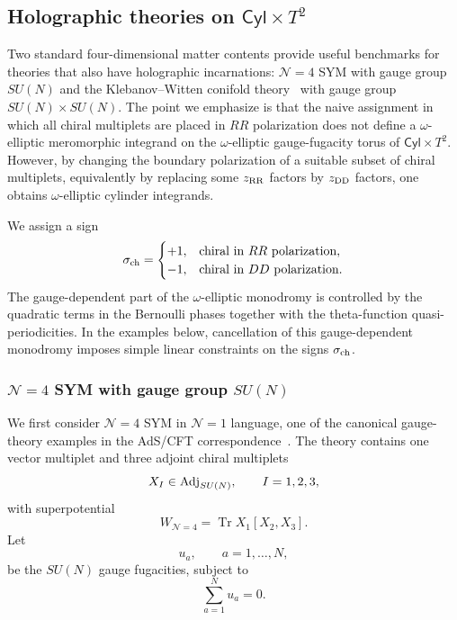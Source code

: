 \documentclass[11pt,a4paper]{article}
\numberwithin{equation}{section}
\theoremstyle{plain}
\theoremstyle{definition}
\theoremstyle{remark}
\newcommand{\cyl}{\mathsf{Cyl}}
\begin{document}
\subsection{Holographic theories on \texorpdfstring{\(\cyl\times T^2\)}{Cyl x T2}}
\label{sec:holographic-benchmarks}

Two standard four-dimensional matter contents provide useful benchmarks for theories that also have holographic incarnations: \(\mathcal N=4\) SYM with gauge group \(SU(N)\)
and the Klebanov--Witten conifold theory~\cite{Klebanov:1998hh} with gauge group \(SU(N)\times SU(N)\).
The point we emphasize is that the naive assignment in which all chiral multiplets
are placed in \(RR\) polarization does not define a \(\omega\)-elliptic meromorphic
integrand on the \(\omega\)-elliptic gauge-fugacity torus of \(\cyl\times T^2\).  However, by changing the
boundary polarization of a suitable subset of chiral multiplets, equivalently by
replacing some \(z_{\rm RR}\) factors by \(z_{\rm DD}\) factors, one obtains
\(\omega\)-elliptic cylinder integrands.

We assign a sign
\begin{equation}
\sigma_{\rm ch}=
\begin{cases}
+1, & \text{chiral in }RR\text{ polarization},\\
-1, & \text{chiral in }DD\text{ polarization}.
\end{cases}
\label{eq:polarization-sign}
\end{equation}
The gauge-dependent part of the \(\omega\)-elliptic monodromy is controlled by the
quadratic terms in the Bernoulli phases together with the theta-function
quasi-periodicities.  In the examples below, cancellation of this gauge-dependent
monodromy imposes simple linear constraints on the signs \(\sigma_{\rm ch}\).

\subsubsection{\texorpdfstring{\(\mathcal N=4\) SYM with gauge group \(SU(N)\)}{N=4 SYM with gauge group SU(N)}}

We first consider \(\mathcal N=4\) SYM in \(\mathcal N=1\) language, one of the canonical gauge-theory examples in the AdS/CFT correspondence~\cite{Maldacena:1997re}.  The theory
contains one vector multiplet and three adjoint chiral multiplets
\begin{equation}
X_I\in {\rm Adj}_{SU(N)},
\qquad
I=1,2,3,
\end{equation}
with superpotential
\begin{equation}
W_{\mathcal N=4}
=
\operatorname{Tr}X_1[X_2,X_3].
\label{eq:N4-superpotential}
\end{equation}
Let
\begin{equation}
u_a,\qquad a=1,\ldots,N,
\end{equation}
be the \(SU(N)\) gauge fugacities, subject to
\begin{equation}
\sum_{a=1}^{N}u_a=0.
\label{eq:N4-SU-constraint}
\end{equation}
\end{document}
